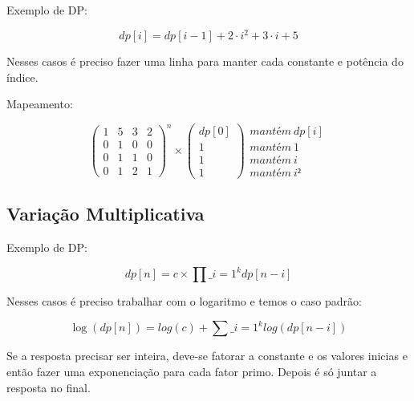 \documentclass[11pt, a4paper, twoside]{article}
\begin{document}
Exemplo de DP:   

$$ dp[i] = dp[i-1] + 2 \cdot i^2 + 3 \cdot i + 5 $$

Nesses casos é preciso fazer uma linha para manter cada constante e potência do índice.

Mapeamento:

$$
\begin{pmatrix} 1&5&3&2 \\ 0&1&0&0 \\ 0&1&1&0 \\ 0&1&2&1 \end{pmatrix}^n
\times
\begin{pmatrix} 
    dp[0]   \\
    1       \\
    1       \\
    1\end
{pmatrix} 
\begin{matrix} 
    mantém\ dp[i]   \\
    mantém\ 1       \\
    mantém\ i       \\
    mantém\ i²      \end
{matrix}
$$

\subsection{Variação Multiplicativa}


Exemplo de DP:

$$ dp[n] =  c\times \prod\_{i=1}^{k} dp[n-i] $$

Nesses casos é preciso trabalhar com o logaritmo e temos o caso padrão:


$$ \log(dp[n]) =  log(c) + \sum\_{i=1}^{k} log(dp[n-i]) $$

Se a resposta precisar ser inteira, deve-se fatorar a constante e os valores inicias e então fazer uma exponenciação para cada fator primo. Depois é só juntar a resposta no final.
\end{document}
